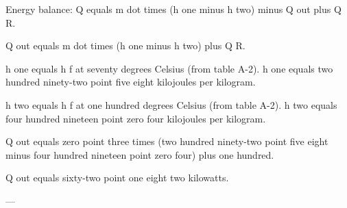 Energy balance:  
Q equals m dot times (h one minus h two) minus Q out plus Q R.  

Q out equals m dot times (h one minus h two) plus Q R.  

h one equals h f at seventy degrees Celsius (from table A-2).  
h one equals two hundred ninety-two point five eight kilojoules per kilogram.  

h two equals h f at one hundred degrees Celsius (from table A-2).  
h two equals four hundred nineteen point zero four kilojoules per kilogram.  

Q out equals zero point three times (two hundred ninety-two point five eight minus four hundred nineteen point zero four) plus one hundred.  

Q out equals sixty-two point one eight two kilowatts.  

---
